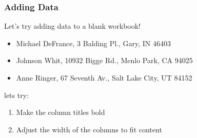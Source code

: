 \documentclass[12pt]{beamer}
\begin{document}
	\begin{frame}
		\frametitle{Adding Data}
		Let's try adding data to a blank workbook!
		\begin{itemize}
			\item Michael DeFrance, 3 Balding Pl., Gary, IN 46403
			\item Johnson Whit, 10932 Bigge Rd., Menlo Park, CA 94025
			\item Anne Ringer, 67 Seventh Av., Salt Lake City, UT 84152
		\end{itemize}
		lets try:
		\begin{enumerate}
			\item Make the column titles bold
			\item Adjust the width of the columns to fit content
		\end{enumerate}
	\end{frame}
	
\end{document}
